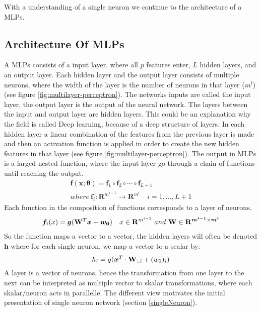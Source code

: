 With a understanding of a single neuron we continue to the architecture of a MLPs.


\subsection{Architecture Of MLPs}\label{architectureMLPs}
A MLPs consists of a input layer, where all $p$ features enter, $L$ hidden layers, and an output layer. Each hidden layer and the output layer consists of multiple neurons, where the width of the layer is the number of neurons in that layer ($m^l$) (see figure \ref{fig:multilayer-perceptron}). The networks inputs are called the input layer, the output layer is the output of the neural network. The layers between the input and output layer are hidden layers. This could be an explanation why the field is called Deep learning, because of a deep structure of layers. In each hidden layer a linear combination of the features from the previous layer is made and then an activation function is applied in order to create the new hidden features in that layer (see figure \ref{fig:multilayer-perceptron}). The output in MLPs is a larged nested function, where the input layer go through a chain of functions until reaching the output.
\begin{align}
\bm{f}(\bm{x};\bm{\theta})=\bm{f}_1 \circ \bm{f}_2 \circ \cdots \circ \bm{f}_{L+1}\\
where \ \bm{f}_i : \mathbf{R}^{m^{i-1}} \to \mathbf{R}^{m^{i}} \quad i=1,\ldots, L+1
\end{align}
Each function in the composition of functions corresponds to a layer of neurons.
\begin{align}
\bm{f}_i(x)=\bm{g}(\mathbf{W}^T \bm{x} + \bm{w_0}) \quad x\in \mathbf{R}^{m^{i-1}} \ and \ \mathbf{W} \in \mathbf{R}^{\bm{m^{i-1}} \times \bm{m^{i}} }
\end{align}
So the function maps a vector to a vector, the hidden layers will often be denoted $\bm{h}$ where for each single neuron, we map a vector to a scalar by:
$$h_i=g(\bm{x}^T \cdot \mathbf{W}_{:,i} + (w_0)_{i})$$
A layer is a vector of neurons, hence the transformation from one layer to the next can be interpreted as multiple vector to skalar transformations, where each skalar/neuron acts in parallelle. The different view motivates the initial presentation of single neuron network (section \ref{singleNeuron}).

